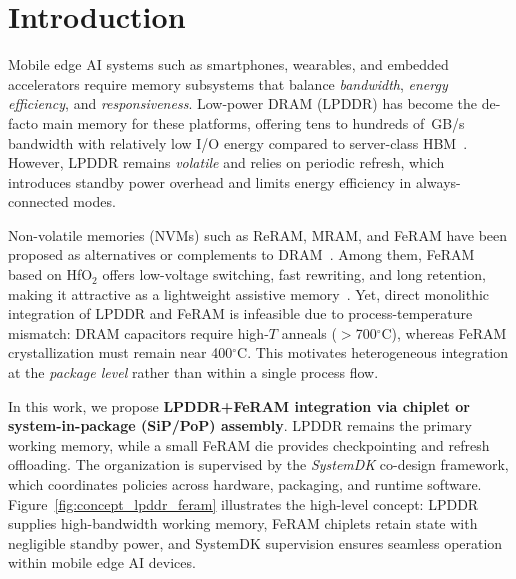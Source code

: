 \section{Introduction}

Mobile edge AI systems such as smartphones, wearables, and embedded accelerators require memory subsystems that balance
\emph{bandwidth}, \emph{energy efficiency}, and \emph{responsiveness}.
Low-power DRAM (LPDDR) has become the de-facto main memory for these platforms, offering tens to hundreds of~GB/s bandwidth
with relatively low I/O energy compared to server-class HBM~\cite{ChoiIEDM2022}.
However, LPDDR remains \emph{volatile} and relies on periodic refresh, which introduces standby power overhead
and limits energy efficiency in always-connected modes.

Non-volatile memories (NVMs) such as ReRAM, MRAM, and FeRAM have been proposed as alternatives or complements to DRAM~\cite{NohedaNature2023,WeebitIEDM2022}.
Among them, FeRAM based on HfO$_2$ offers low-voltage switching, fast rewriting, and long retention,
making it attractive as a lightweight assistive memory~\cite{KimIEDM2021}.
Yet, direct monolithic integration of LPDDR and FeRAM is infeasible due to process-temperature mismatch:
DRAM capacitors require high-$T$ anneals ($>$700$^\circ$C), whereas FeRAM crystallization must remain near 400$^\circ$C.
This motivates heterogeneous integration at the \emph{package level} rather than within a single process flow.

In this work, we propose \textbf{LPDDR+FeRAM integration via chiplet or system-in-package (SiP/PoP) assembly}.
LPDDR remains the primary working memory, while a small FeRAM die provides checkpointing and refresh offloading.
The organization is supervised by the \emph{SystemDK} co-design framework, which coordinates policies across hardware, packaging, and runtime software.
Figure~\ref{fig:concept_lpddr_feram} illustrates the high-level concept:
LPDDR supplies high-bandwidth working memory, FeRAM chiplets retain state with negligible standby power, 
and SystemDK supervision ensures seamless operation within mobile edge AI devices.
